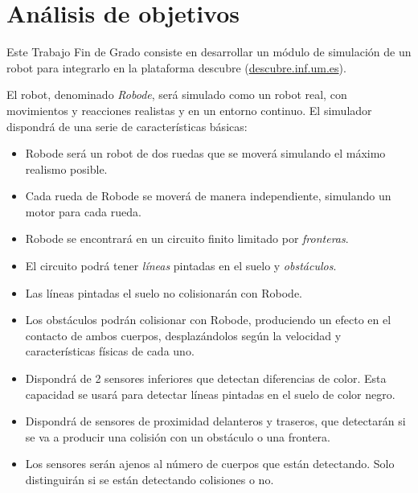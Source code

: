 \chapter{Análisis de objetivos}
\label{objetivos-metodologia-herramientas}

\label{sec:objetivos}

Este Trabajo Fin de Grado consiste en desarrollar un módulo de simulación de un robot para integrarlo en la plataforma \Gls{descubre} (\url{descubre.inf.um.es}).

El robot, denominado \emph{Robode}, será simulado como un robot real, con movimientos y reacciones realistas y en un entorno continuo. El simulador dispondrá de una serie de características básicas:
\begin{itemize}
	\item Robode será un robot de dos ruedas que se moverá simulando el máximo realismo posible.
	\item Cada rueda de Robode se moverá de manera independiente, simulando un motor para cada rueda. 
	\item Robode se encontrará en un circuito finito limitado por \emph{fronteras}.
	\item El circuito podrá tener \emph{líneas} pintadas en el suelo y \emph{obstáculos}.
	\item Las líneas pintadas el suelo no colisionarán con Robode.
	\item Los obstáculos podrán colisionar con Robode, produciendo un efecto en el contacto de ambos cuerpos, desplazándolos según la velocidad y características físicas de cada uno.
	\item Dispondrá de 2 sensores inferiores que detectan diferencias de color. Esta capacidad se usará para detectar líneas pintadas en el suelo de color negro.
	\item Dispondrá de sensores de proximidad delanteros y traseros, que detectarán si se va a producir una colisión con un obstáculo o una frontera.
	\item Los sensores serán ajenos al número de cuerpos que están detectando. Solo distinguirán si se están detectando colisiones  o no.
\end{itemize}



